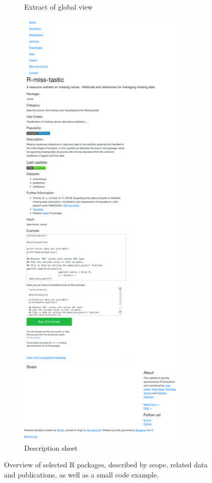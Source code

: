 \begin{figure}
\begin{center}
\begin{subfigure}[b]{0.575\textwidth}
\caption{Extract of global view}
\end{subfigure}
\begin{subfigure}[b]{0.415\textwidth}
\includegraphics[width=0.9\textwidth]{figures/local-packages-1.pdf}
\caption{Description sheet}
\end{subfigure}
\end{center}
\caption{Overview of selected {R} packages, described by scope, related data and publications, as well as a small code example. \label{fig:packages}}
\end{figure}

